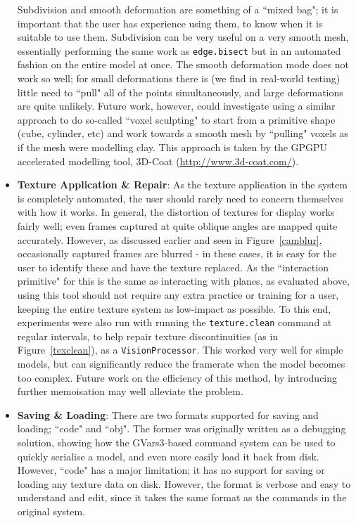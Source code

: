 \documentclass[a4paper,10pt]{article}
\begin{document}
\begin{itemize}
{Subdivision and smooth deformation are something of a ``mixed bag"; it is important that the user has experience using them, to know when it is suitable to use them. Subdivision can be very useful on a very smooth mesh, essentially performing the same work as \texttt{edge.bisect} but in an automated fashion on the entire model at once. The smooth deformation mode does not work so well; for small deformations there is (we find in real-world testing) little need to ``pull" all of the points simultaneously, and large deformations are quite unlikely. Future work, however, could investigate using a similar approach to do so-called ``voxel sculpting" to start from a primitive shape (cube, cylinder, etc) and work towards a smooth mesh by ``pulling" voxels as if the mesh were modelling clay. This approach is taken by the GPGPU accelerated modelling tool, 3D-Coat (\url{http://www.3d-coat.com/}).
}

\item{\textbf{Texture Application \& Repair}: As the texture application in the system is completely automated, the user should rarely need to concern themselves with how it works. In general, the distortion of textures for display works fairly well; even frames captured at quite oblique angles are mapped quite accurately. However, as discussed earlier and seen in Figure~\ref{camblur}, occasionally captured frames are blurred - in these cases, it is easy for the user to identify these and have the texture replaced. As the ``interaction primitive" for this is the same as interacting with planes, as evaluated above, using this tool should not require any extra practice or training for a user, keeping the entire texture system as low-impact as possible. To this end, experiments were also run with running the \texttt{texture.clean} command at regular intervals, to help repair texture discontinuities (as in Figure~\ref{texclean}), as a \texttt{VisionProcessor}. This worked very well for simple models, but can significantly reduce the framerate when the model becomes too complex. Future work on the efficiency of this method, by introducing further memoisation may well alleviate the problem.
}

\item{\textbf{Saving \& Loading}: There are two formats supported for saving and loading; ``code" and ``obj". The former was originally written as a debugging solution, showing how the GVars3-based command system can be used to quickly serialise a model, and even more easily load it back from disk. However, ``code" has a major limitation; it has no support for saving or loading any texture data on disk. However, the format is verbose and easy to understand and edit, since it takes the same format as the commands in the original system.

}
\end{itemize}
\end{document}
